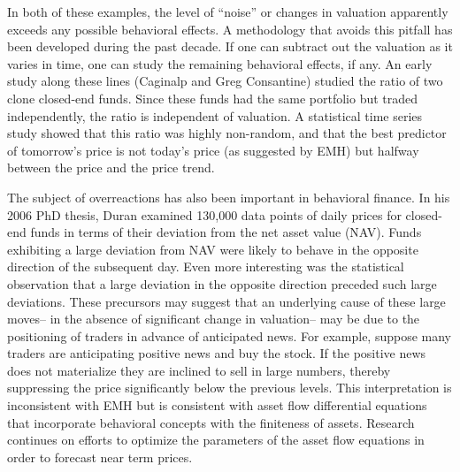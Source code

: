 In both of these examples, the level of “noise” or changes in valuation apparently exceeds any possible behavioral effects. A methodology that avoids this pitfall has been developed during the past decade. If one can subtract out the valuation as it varies in time, one can study the remaining behavioral effects, if any. An early study along these lines (Caginalp and Greg Consantine) studied the ratio of two clone closed-end funds. Since these funds had the same portfolio but traded independently, the ratio is independent of valuation. A statistical time series study showed that this ratio was highly non-random, and that the best predictor of tomorrow’s price is not today’s price (as suggested by EMH) but halfway between the price and the price trend.
 
The subject of overreactions has also been important in behavioral finance. In his 2006 PhD thesis, Duran examined 130,000 data points of daily prices for closed-end funds in terms of their deviation from the net asset value (NAV). Funds exhibiting a large deviation from NAV were likely to behave in the opposite direction of the subsequent day. Even more interesting was the statistical observation that a large deviation in the opposite direction preceded such large deviations. These precursors may suggest that an underlying cause of these large moves-- in the absence of significant change in valuation-- may be due to the positioning of traders in advance of anticipated news. For example, suppose many traders are anticipating positive news and buy the stock. If the positive news does not materialize they are inclined to sell in large numbers, thereby suppressing the price significantly below the previous levels. This interpretation is inconsistent with EMH but is consistent with asset flow differential equations that incorporate behavioral concepts with the finiteness of assets. Research continues on efforts to optimize the parameters of the asset flow equations in order to forecast near term prices.
 
